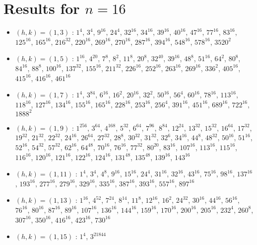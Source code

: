 \section{Results for $n=16$}
\begin{itemize}
\item $(h,k)=(1,3)$ : $1^{4}$, $3^{4}$, $9^{16}$, $24^{4}$, $32^{16}$, $34^{16}$, $39^{16}$, $40^{16}$, $47^{16}$, $77^{16}$, $83^{16}$, $125^{16}$, $165^{16}$, $216^{32}$, $220^{16}$, $269^{16}$, $270^{16}$, $287^{16}$, $394^{16}$, $548^{16}$, $578^{16}$, $3520^{2}$
\item $(h,k)=(1,5)$ : $1^{16}$, $4^{20}$, $7^{8}$, $8^{2}$, $11^{8}$, $20^{8}$, $32^{40}$, $39^{16}$, $48^{8}$, $51^{16}$, $64^{2}$, $80^{8}$, $84^{16}$, $88^{8}$, $100^{16}$, $137^{32}$, $155^{16}$, $211^{32}$, $226^{16}$, $252^{16}$, $263^{16}$, $269^{16}$, $336^{2}$, $405^{16}$, $415^{16}$, $416^{16}$, $461^{16}$
\item $(h,k)=(1,7)$ : $1^{4}$, $3^{84}$, $6^{16}$, $16^{2}$, $20^{16}$, $32^{2}$, $50^{16}$, $56^{4}$, $60^{16}$, $78^{16}$, $113^{16}$, $118^{16}$, $127^{16}$, $134^{16}$, $155^{16}$, $165^{16}$, $228^{16}$, $253^{16}$, $256^{4}$, $391^{16}$, $451^{16}$, $689^{16}$, $722^{16}$, $1888^{2}$
\item $(h,k)=(1,9)$ : $1^{256}$, $3^{64}$, $4^{168}$, $5^{32}$, $6^{64}$, $7^{96}$, $8^{84}$, $12^{24}$, $13^{32}$, $15^{32}$, $16^{64}$, $17^{32}$, $19^{32}$, $21^{32}$, $22^{32}$, $24^{16}$, $26^{64}$, $27^{32}$, $28^{8}$, $30^{32}$, $31^{32}$, $32^{6}$, $34^{16}$, $44^{8}$, $48^{32}$, $50^{16}$, $51^{16}$, $52^{16}$, $54^{32}$, $57^{32}$, $62^{16}$, $64^{48}$, $70^{16}$, $76^{16}$, $77^{32}$, $80^{20}$, $83^{16}$, $107^{16}$, $113^{16}$, $115^{16}$, $116^{16}$, $120^{16}$, $121^{16}$, $122^{16}$, $124^{16}$, $131^{48}$, $135^{48}$, $139^{16}$, $143^{16}$
\item $(h,k)=(1,11)$ : $1^{4}$, $3^{4}$, $4^{8}$, $9^{16}$, $15^{16}$, $24^{4}$, $31^{16}$, $32^{16}$, $43^{16}$, $75^{16}$, $98^{16}$, $137^{16}$, $193^{16}$, $277^{16}$, $279^{16}$, $329^{16}$, $335^{16}$, $387^{16}$, $393^{16}$, $557^{16}$, $897^{16}$
\item $(h,k)=(1,13)$ : $1^{16}$, $4^{52}$, $7^{24}$, $8^{14}$, $11^{8}$, $12^{16}$, $16^{2}$, $24^{32}$, $30^{16}$, $44^{16}$, $56^{16}$, $76^{16}$, $80^{16}$, $87^{16}$, $89^{16}$, $107^{16}$, $136^{16}$, $144^{16}$, $159^{16}$, $170^{16}$, $200^{16}$, $205^{16}$, $232^{4}$, $260^{8}$, $307^{16}$, $350^{16}$, $416^{16}$, $423^{16}$, $730^{16}$
\item $(h,k)=(1,15)$ : $1^{4}$, $3^{21844}$

\end{itemize}
